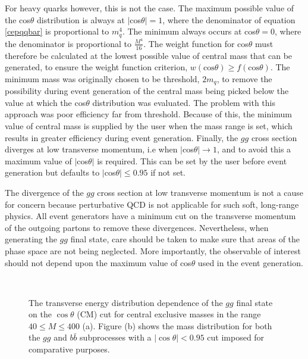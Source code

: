 For heavy quarks however, this is not the case. 
The maximum possible value of the cos$\theta$ distribution is always at $|$cos$\theta|=1$, where the denominator of equation \ref{cepqqbar} is proportional to $m_q^{4}$. The minimum always occurs at cos$\theta=0$, where the denominator is proportional to $\frac{M^4}{16}$. The weight function for cos$\theta$ must therefore be calculated at the lowest possible value of central mass that can be generated, to ensure the weight function criterion, $w(\text{cos}\theta) \geq f(\text{cos}\theta)$.
The minimum mass was originally chosen to be threshold, $2m_q$, to remove the possibility during event generation of the central mass being picked below the value at which the cos$\theta$ distribution was evaluated. The problem with this approach was poor efficiency far from threshold. Because of this, the minimum value of central mass is supplied by the user when the mass range is set, which results in greater efficiency during event generation. 
Finally, the $gg$ cross section diverges at low transverse momentum, i.e when $|$cos$\theta| \rightarrow 1$, and to avoid this a maximum value of $|$cos$\theta|$ is required. This can be set by the user before event generation but defaults to $|$cos$\theta| \leq 0.95$ if not set.

The divergence of the $gg$ cross section at low transverse momentum is not a cause for concern because perturbative QCD is not applicable for such soft, long-range physics. All event generators have a minimum cut on the transverse momentum of the outgoing partons to remove these divergences.  Nevertheless, when generating the $gg$ final state, care should be taken to make sure that areas of the phase space are not being neglected. More importantly, the observable of interest should not depend upon the maximum value of cos$\theta$ used in the event generation.

\begin{figure} 
\centering
\mbox{
	\quad
	}
\caption[The transverse energy dependence of the $gg$ final state on the  $\cos\theta$ cut used in event generation by ExHuME. Also shown is the mass distribution for the $gg$ and $q\bar{q}$ final states]{The transverse energy distribution dependence of the $gg$ final state on the $\cos\theta$ (CM) cut for central exclusive masses in the range $40\leq M \leq 400$ (a). Figure (b) shows the mass distribution for both the $gg$ and $b\bar{b}$ subprocesses with a $|\cos\theta|<0.95$ cut imposed for comparative purposes.\label{dipartonplots}}
\end{figure}


